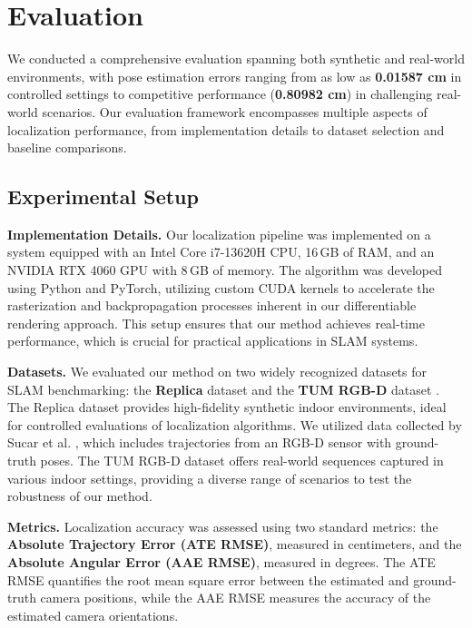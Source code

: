 \documentclass[twocolumn]{article}
\begin{document}
\section{Evaluation}\label{evaluation}

We conducted a comprehensive evaluation spanning both synthetic and
real-world environments, with pose estimation errors ranging from as low
as \textbf{0.01587 cm} in controlled settings to competitive performance
(\textbf{0.80982 cm}) in challenging real-world scenarios. Our
evaluation framework encompasses multiple aspects of localization
performance, from implementation details to dataset selection and
baseline comparisons.

\subsection{Experimental Setup}\label{experimental-setup}

\textbf{Implementation Details.} Our localization pipeline was
implemented on a system equipped with an Intel Core i7-13620H CPU,
16\,GB of RAM, and an NVIDIA RTX 4060 GPU with 8\,GB of memory. The
algorithm was developed using Python and PyTorch, utilizing custom CUDA
kernels to accelerate the rasterization and backpropagation processes
inherent in our differentiable rendering approach. This setup ensures
that our method achieves real-time performance, which is crucial for
practical applications in SLAM systems.

\textbf{Datasets.} We evaluated our method on two widely recognized
datasets for SLAM benchmarking: the \textbf{Replica} dataset
\autocite{straubReplicaDatasetDigital2019} and the \textbf{TUM RGB-D}
dataset \autocite{sturmBenchmarkEvaluationRGBD2012}. The Replica dataset
provides high-fidelity synthetic indoor environments, ideal for
controlled evaluations of localization algorithms. We utilized data
collected by Sucar et al. \autocite{sucarImapImplicitMapping2021}, which
includes trajectories from an RGB-D sensor with ground-truth poses. The
TUM RGB-D dataset\autocite{sturmBenchmarkEvaluationRGBD2012} offers
real-world sequences captured in various indoor settings, providing a
diverse range of scenarios to test the robustness of our method.

\textbf{Metrics.} Localization accuracy was assessed using two standard
metrics: the \textbf{Absolute Trajectory Error (ATE RMSE)}, measured in
centimeters, and the \textbf{Absolute Angular Error (AAE RMSE)},
measured in degrees. The ATE RMSE quantifies the root mean square error
between the estimated and ground-truth camera positions, while the AAE
RMSE measures the accuracy of the estimated camera orientations.
\end{document}
